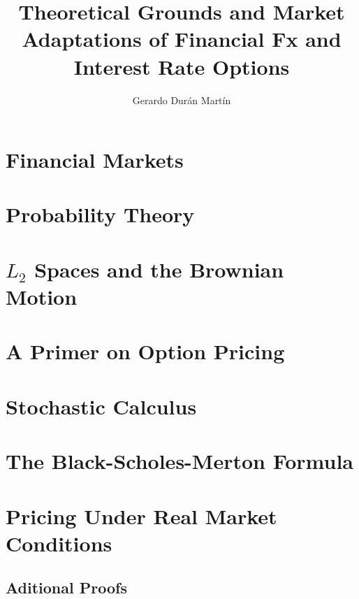 \documentclass[11pt]{report}
\title{Theoretical Grounds and Market Adaptations of Financial Fx and Interest Rate Options}
\author{Gerardo Dur\'an Mart\'in}
\begin{document}
\tableofcontents

\chapter{Financial Markets}


\chapter{Probability Theory}


\chapter{$L_2$ Spaces and the Brownian Motion}


\chapter{A Primer on Option Pricing}
\chapter{Stochastic Calculus}
\chapter{The Black-Scholes-Merton Formula}
\chapter{Pricing Under Real Market Conditions}

\begin{appendices}
\makeatletter
{}
\makeatother 
  \chapter{Aditional Proofs}
  
  
\end{appendices}

\newpage
\nocite{*}

\end{document}
